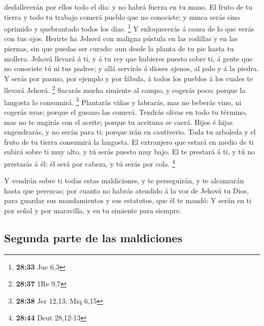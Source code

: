 desfallecerán por ellos todo el día: y no habrá fuerza en tu mano.
 El fruto de tu tierra y todo tu trabajo comerá pueblo
que no conociste; y nunca serás sino oprimido y quebrantado todos los
días. \footnote{\textbf{28:33} Jue 6,3}  Y enloquecerás á
causa de lo que verás con tus ojos.  Herirte ha Jehová
con maligna pústula en las rodillas y en las piernas, sin que puedas ser
curado: aun desde la planta de tu pie hasta tu mollera. 
Jehová llevará á ti, y á tu rey que hubieres puesto sobre ti, á gente
que no conociste tú ni tus padres; y allá servirás á dioses ajenos, al
palo y á la piedra.  Y serás por pasmo, por ejemplo y por
fábula, á todos los pueblos á los cuales te llevará Jehová. \footnote{\textbf{28:37}
  1Re 9,7}  Sacarás mucha simiente al campo, y cogerás
poco; porque la langosta lo consumirá. \footnote{\textbf{28:38} Jer
  12,13; Miq 6,15}  Plantarás viñas y labrarás, mas no
beberás vino, ni cogerás uvas; porque el gusano las comerá.
 Tendrás olivas en todo tu término, mas no te ungirás con
el aceite; porque tu aceituna se caerá.  Hijos é hijas
engendrarás, y no serán para ti; porque irán en cautiverio.
 Toda tu arboleda y el fruto de tu tierra consumirá la
langosta.  El extranjero que estará en medio de ti subirá
sobre ti muy alto, y tú serás puesto muy bajo.  El te
prestará á ti, y tú no prestarás á él: él será por cabeza, y tú serás
por cola. \footnote{\textbf{28:44} Deut 28,12-13}

 Y vendrán sobre ti todas estas maldiciones, y te
perseguirán, y te alcanzarán hasta que perezcas; por cuanto no habrás
atendido á la voz de Jehová tu Dios, para guardar sus mandamientos y sus
estatutos, que él te mandó:  Y serán en ti por señal y
por maravilla, y en tu simiente para siempre.

\hypertarget{segunda-parte-de-las-maldiciones}{%
\subsection{Segunda parte de las
maldiciones}\label{segunda-parte-de-las-maldiciones}}

